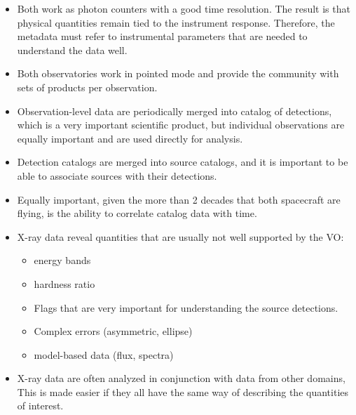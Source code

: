 \begin{itemize}[noitemsep,topsep=0pt,parsep=0pt,partopsep=0pt]
    \item Both work as photon counters with a good time resolution.
          The result is that physical quantities remain tied to the instrument response.
          Therefore, the metadata must refer to instrumental parameters that are needed to
          understand the data well.
    \item Both observatories work in pointed mode and provide the community with sets of products per observation.
    \item Observation-level data are periodically merged into catalog of detections, 
          which is a very important scientific product,
          but individual observations are equally important and are used directly for analysis. 
     \item Detection catalogs are merged into source catalogs, and it is important to be able to
           associate sources with their detections.
     \item Equally important, given the more than 2 decades that both spacecraft are flying,
           is the ability to correlate catalog data with time.
     \item X-ray data reveal quantities that are usually not well supported by the VO: 
           \begin{itemize}
               \item energy bands
               \item hardness ratio
               \item Flags that are very important for understanding the source detections.
               \item Complex errors (asymmetric, ellipse)
               \item model-based data (flux, spectra) 
           \end{itemize}
    \item X-ray data are often analyzed in conjunction with data from other domains, 
          This is made easier if they all have the same way of describing the quantities of interest.
\end{itemize}




